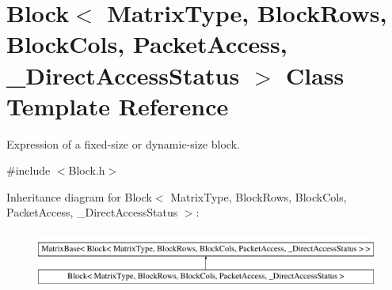 \hypertarget{class_block}{\section{Block$<$ Matrix\-Type, Block\-Rows, Block\-Cols, Packet\-Access, \-\_\-\-Direct\-Access\-Status $>$ Class Template Reference}
\label{class_block}
}


Expression of a fixed-\/size or dynamic-\/size block.  




{\ttfamily \#include $<$Block.\-h$>$}

Inheritance diagram for Block$<$ Matrix\-Type, Block\-Rows, Block\-Cols, Packet\-Access, \-\_\-\-Direct\-Access\-Status $>$\-:\begin{figure}[H]
\begin{center}
\leavevmode
\includegraphics[height=1.947826cm]{class_block}
\end{center}
\end{figure}
